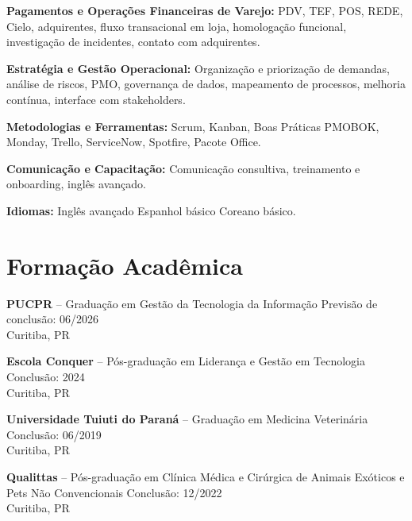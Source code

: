 \documentclass[11pt,a4paper]{article}
\begin{document}
\textbf{Pagamentos e Operações Financeiras de Varejo:} PDV, TEF, POS, REDE, Cielo, adquirentes, fluxo transacional em loja, homologação funcional, investigação de incidentes, contato com adquirentes.

\textbf{Estratégia e Gestão Operacional:} Organização e priorização de demandas, análise de riscos, PMO, governança de dados, mapeamento de processos, melhoria contínua, interface com stakeholders.

\textbf{Metodologias e Ferramentas:} Scrum, Kanban, Boas Práticas PMOBOK, Monday, Trello, ServiceNow, Spotfire, Pacote Office.

\textbf{Comunicação e Capacitação:} Comunicação consultiva, treinamento e onboarding, inglês avançado.

\textbf{Idiomas:} Inglês avançado \textbullet{} Espanhol básico \textbullet{} Coreano básico.

\section*{Formação Acadêmica}

\textbf{PUCPR} -- Graduação em Gestão da Tecnologia da Informação \hfill Previsão de conclusão: 06/2026\\
Curitiba, PR

\textbf{Escola Conquer} -- Pós-graduação em Liderança e Gestão em Tecnologia \hfill Conclusão: 2024\\
Curitiba, PR

\textbf{Universidade Tuiuti do Paraná} -- Graduação em Medicina Veterinária \hfill Conclusão: 06/2019\\
Curitiba, PR

\textbf{Qualittas} -- Pós-graduação em Clínica Médica e Cirúrgica de Animais Exóticos e Pets Não Convencionais \hfill Conclusão: 12/2022\\
Curitiba, PR
\end{document}
